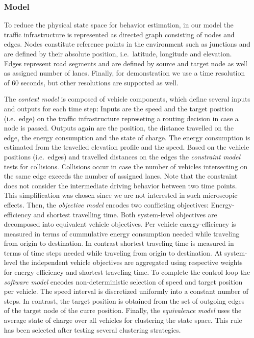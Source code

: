 \documentclass[conference]{../cls/IEEEtran}
\begin{document}
\subsubsection*{Model}

To reduce the physical state space for behavior estimation, in our model the traffic infrastructure is represented as directed graph consisting of nodes and edges. Nodes constitute reference points in the environment such as junctions and are defined by their absolute position, i.e.\ latitude, longitude and elevation. Edges represent road segments and are defined by source and target node as well as assigned number of lanes. Finally, for demonstration we use a time resolution of 60 seconds, but other resolutions are supported as well.

The \textit{context model} is composed of vehicle components, which define several inputs and outputs for each time step: Inputs are the speed and the target position (i.e.\ edge) on the traffic infrastructure represeting a routing decision in case a node is passed. Outputs again are the position, the distance travelled on the edge, the energy consumption and the state of charge. The energy consumption is estimated from the travelled elevation profile and the speed. Based on the vehicle positions (i.e.\ edges) and travelled distances on the edges the \textit{constraint model} tests for collisions. Collisions occur in case the number of vehicles intersecting on the same edge exceeds the number of assigned lanes. Note that the constraint does not consider the intermediate driving behavior between two time points. This simplification was chosen since we are not interested in such microscopic effects. Then, the \textit{objective model} encodes two conflicting objectives: Energy-efficiency and shortest travelling time. Both system-level objectives are decomposed into equivalent vehicle objectives. Per vehicle energy-efficiency is measured in terms of cummulative energy consumption needed while traveling from origin to destination. In contrast shortest traveling time is measured in terms of time steps needed while traveling from origin to destination. At system-level the independent vehicle objectives are aggregated using respective weights for energy-efficiency and shortest traveling time. To complete the control loop the \textit{software model} encodes non-deterministic selection of speed and target position per vehicle. The speed interval is discretized uniformly into a constant number of steps. In contrast, the target position is obtained from the set of outgoing edges of the target node of the curre position. Finally, the \textit{equivalence model} uses the average state of charge over all vehicles for clustering the state space. This rule has been selected after testing several clustering strategies.
\end{document}
